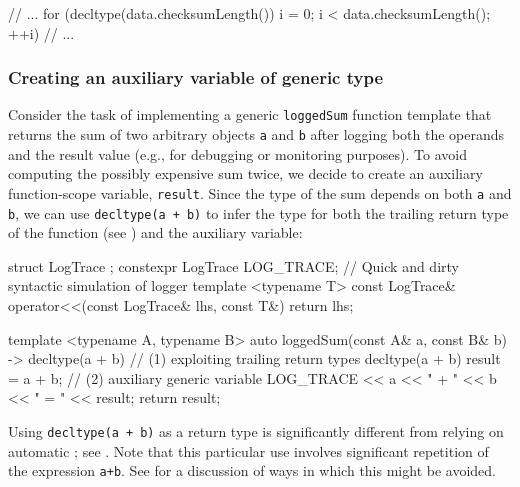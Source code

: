 \begin{emcppshiddenlisting}[emcppsbatch=e7]
void g(const Packet &data)
{
\end{emcppshiddenlisting}
\begin{emcppslisting}[emcppsbatch=e7]
// ...
for (decltype(data.checksumLength()) i = 0; i < data.checksumLength(); ++i)
// ...
\end{emcppslisting}
\begin{emcppshiddenlisting}[emcppsbatch=e7]
{}
} // end g
\end{emcppshiddenlisting}

\subsubsection[Creating an auxiliary variable of generic type]{Creating an auxiliary variable of generic type}\label{creating-an-auxiliary-variable-of-generic-type}

Consider the task of implementing a generic \lstinline!loggedSum! function
template that returns the sum of two arbitrary objects \lstinline!a! and
\lstinline!b! after logging both the operands and the result value (e.g.,
for debugging or monitoring purposes). To avoid computing the possibly
expensive sum twice, we decide to create an auxiliary function-scope
variable, \lstinline!result!. Since the type of the sum depends on both
\lstinline!a! and \lstinline!b!, we can use
\lstinline!decltype(a!~\lstinline!+!~\lstinline!b)! to infer the type for both
the trailing return type of the
function (see %
) and the auxiliary variable:

\begin{emcppshiddenlisting}[emcppsbatch=e8]
struct LogTrace {};
constexpr LogTrace LOG_TRACE; // Quick and dirty syntactic simulation of logger
template <typename T>
const LogTrace& operator<<(const LogTrace& lhs, const T&) { return lhs; }
\end{emcppshiddenlisting}
\begin{emcppslisting}[emcppsbatch=e8]
template <typename A, typename B>
auto loggedSum(const A& a, const B& b)
    -> decltype(a + b)                 // (1) exploiting trailing return types
{
    decltype(a + b) result = a + b;    // (2) auxiliary generic variable
    LOG_TRACE << a << " + " << b << " = " << result;
    return result;
}
\end{emcppslisting}
Using \lstinline!decltype(a!~\lstinline!+!~\lstinline!b)! as a return type is significantly different from relying on automatic ; see . Note that this particular use involves significant repetition of the expression \lstinline!a+b!.  See
for a discussion of ways in which this might be avoided.


